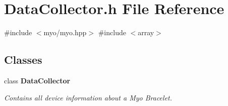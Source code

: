 \section{Data\+Collector.\+h File Reference}
\label{_data_collector_8h}
{\ttfamily \#include $<$myo/myo.\+hpp$>$}\newline
{\ttfamily \#include $<$array$>$}\newline
\subsection*{Classes}
\begin{DoxyCompactItemize}
\item 
class \textbf{ Data\+Collector}
\begin{DoxyCompactList}\small\item\em Contains all device information about a Myo Bracelet. \end{DoxyCompactList}\end{DoxyCompactItemize}
